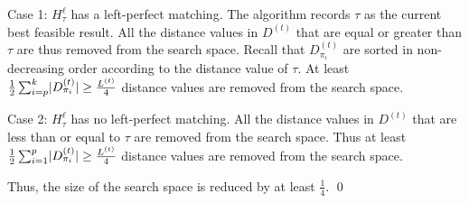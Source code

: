 Case 1: $H^{\ell}_{\tau}$ has a left-perfect matching.
The algorithm records $\tau$ as the current best feasible result. 
All the distance values in $D^{(t)}$ that are equal or greater than $\tau$ are thus removed from the search space. 
Recall that $D_{\pi_i}^{(t)}$ are sorted in non-decreasing order according to the distance value of $\tau$. 
At least $\frac{1}{2} \sum_{i=p}^{k} \lvert D_{\pi_{i}}^{(t)} \rvert  \geq \frac{L^{(t)}}{4}$ distance values are removed from the search space.


Case 2: $H^{\ell}_{\tau}$ has no left-perfect matching. 
All the distance values in $D^{(t)}$ that are less than or equal to $\tau$ are removed from the search space.
Thus at least $\frac{1}{2} \sum_{i=1}^{p} \lvert D_{\pi_{i}}^{(t)} \rvert  \geq \frac{L^{(t)}}{4}$ distance values are removed from the search space.

Thus, the size of the search space is reduced by at least $\frac{1}{4}$.
\hfill\qed



    
















        
